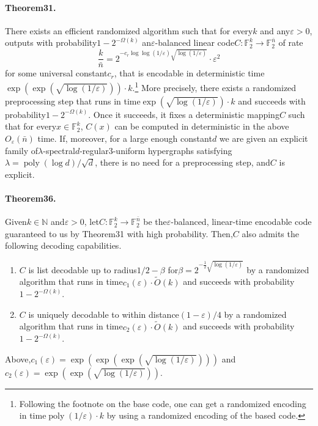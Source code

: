 \documentclass[10pt,a4paper]{article}
\begin{document}
\paragraph{Theorem31.} There exists an efficient randomized algorithm such that for every$k$ and any$\varepsilon>0$, outputs with probability$1-2^{-\Omega(k)}$ an$\varepsilon$-balanced linear code$C:\mathbb F_2^k\to\mathbb F_2^{\bar n}$ of rate
\[\frac k{\bar n}=2^{-c_r\log\log(1/\varepsilon)\sqrt{\log(1/\varepsilon)}}\cdot\varepsilon^2\]
for some universal constant$c_r$, that is encodable in deterministic time$\exp(\exp(\sqrt{\log(1/\varepsilon)}))\cdot k$.\footnote{Following the footnote on the base code, one can get a randomized encoding in time$\operatorname{poly}(1/\varepsilon)\cdot k$ by using a randomized encoding of the based code.} More precisely, there exists a randomized preprocessing step that runs in time$\exp(\sqrt{\log(1/\varepsilon)})\cdot k$ and succeeds with probability$1-2^{-\Omega(k)}$. Once it succeeds, it fixes a deterministic mapping$C$ such that for every$x\in\mathbb F_2^k$, $C(x)$ can be computed in deterministic in the above$O_{\varepsilon}(\bar n)$ time.
If, moreover, for a large enough constant$d$ we are given an explicit family of$\lambda$-spectral$d$-regular3-uniform hypergraphs satisfying$\lambda=\operatorname{poly}(\log d)/\sqrt d$, there is no need for a preprocessing step, and$C$ is explicit.
\paragraph{Theorem36.} Given$k\in\mathbb N$ and$\varepsilon>0$, let$C:\mathbb F_2^k\to\mathbb F_2^{\bar n}$ be the$\varepsilon$-balanced, linear-time encodable code guaranteed to us by Theorem31 with high probability. Then,$C$ also admits the following decoding capabilities.
\begin{enumerate}
\item $C$ is list decodable up to radius$1/2-\beta$ for$\beta=2^{-\frac12\sqrt{\log(1/\varepsilon)}}$ by a randomized algorithm that runs in time$c_1(\varepsilon)\cdot\widetilde O(k)$ and succeeds with probability$1-2^{-\Omega(k)}$.
\item $C$ is uniquely decodable to within distance$(1-\varepsilon)/4$ by a randomized algorithm that runs in time$c_2(\varepsilon)\cdot\widetilde O(k)$ and succeeds with probability$1-2^{-\Omega(k)}$.
\end{enumerate}
Above,$c_1(\varepsilon)=\exp(\exp(\exp(\sqrt{\log(1/\varepsilon)})))$ and$c_2(\varepsilon)=\exp(\exp(\sqrt{\log(1/\varepsilon)}))$.
\end{document}
